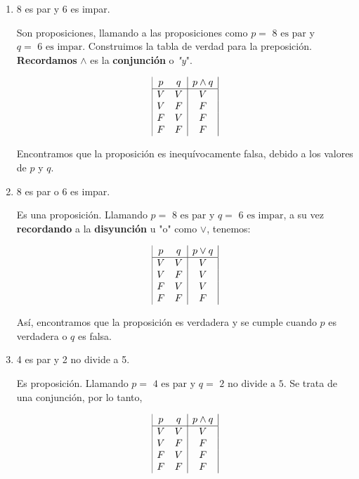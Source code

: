 \begin{enumerate}
	\item 8 es par y 6 es impar. 

	Son proposiciones, llamando a las proposiciones como $p = \text{ 8 es par}$ y $q = \text{ 6 es impar}$. Construimos la tabla de verdad para la preposici\'on. \textbf{Recordamos} $\wedge$ es la \textbf{conjunci\'on} o \textit{"y}". 
	
	\begin{displaymath}
		\begin{array}{|c c|c|}
			p & q & p \land q\\
			\hline 
			V & V & V\\
			V & F & F\\
			F & V & F\\
			F & F & F\\
		\end{array}
	\end{displaymath}

	Encontramos que la proposici\'on es inequívocamente falsa, debido a los valores de $p$ y $q$.
	
	\item 8 es par o 6 es impar.
	
	Es una proposici\'on. Llamando $p = \text{ 8 es par}$ y $q = \text{ 6 es impar}$, a su vez \textbf{recordando} a la \textbf{disyunci\'on} u "o" como $\vee$, tenemos:
	
	\begin{displaymath}
		\begin{array}{|c c|c|}
			p & q & p \vee q\\
			\hline 
			V & V & V\\
			V & F & V\\
			F & V & V\\
			F & F & F\\
		\end{array}
	\end{displaymath}

	As\'i, encontramos que la proposici\'on es verdadera y se cumple cuando $p$ es verdadera o $q$ es falsa.
	
	\item 4 es par y 2 no divide a 5.
	
	Es proposici\'on. Llamando $p = \text{ 4 es par}$ y $q = \text{ 2 no divide a 5}$. Se trata de una conjunci\'on, por lo tanto, 	
	
	\begin{displaymath}
		\begin{array}{|c c|c|}
			p & q & p \land q\\
			\hline 
			V & V & V\\
			V & F & F\\
			F & V & F\\
			F & F & F\\
		\end{array}
	\end{displaymath}


\end{enumerate}
